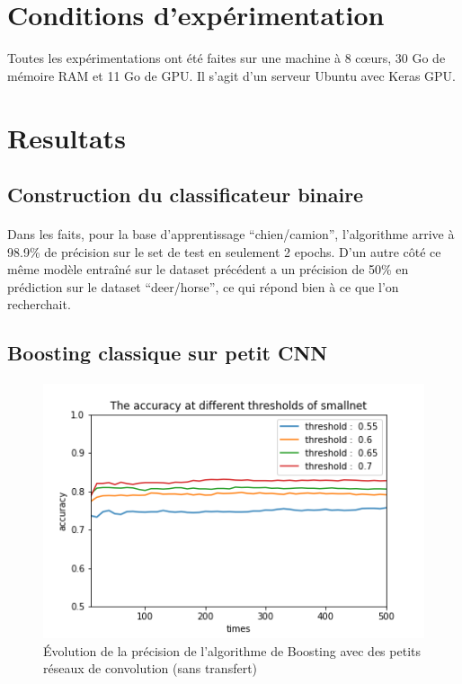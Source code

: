 \documentclass[11 pt]{article}
\begin{document}
\section{Conditions d’expérimentation}
Toutes les expérimentations ont été faites sur une machine à 8 cœurs, 30 Go de mémoire RAM et 11 Go de GPU. Il s'agit d'un serveur Ubuntu avec Keras GPU.

\section{Resultats}
\subsection{Construction du classificateur binaire}
\paragraph{}Dans les faits, pour la base d’apprentissage “chien/camion”, l’algorithme arrive à 98.9\% de précision sur le set de test en seulement 2 epochs. D’un autre côté ce même modèle entraîné sur le dataset précédent a un précision de 50\% en prédiction sur le dataset “deer/horse”, ce qui répond bien à ce que l’on recherchait.

\subsection{Boosting classique sur petit CNN}
\paragraph{}

\begin{figure}[H]
\begin{center}
\centerline{\includegraphics[width=\textwidth]{smallnet.png}}
\caption{Évolution de la précision de l'algorithme de Boosting avec des petits réseaux de convolution (sans transfert) }
\label{fig:smallNet}
\end{center}
\end{figure}
\end{document}
